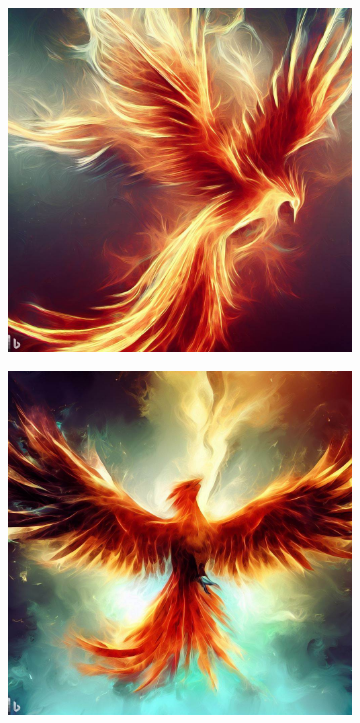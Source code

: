 \documentclass[11pt, twoside]{article}
\begin{document}
\begin{figure}[H]
\begin{subfigure}{0.3\textwidth}
    \includegraphics[width=0.99\linewidth]{phoenix2.jpeg}
  \end{subfigure}%
  \begin{subfigure}{0.3\textwidth}
    \centering
    \includegraphics[width=0.99\linewidth]{phoenix3.jpeg}
  \end{subfigure}
\end{figure}
\end{document}
